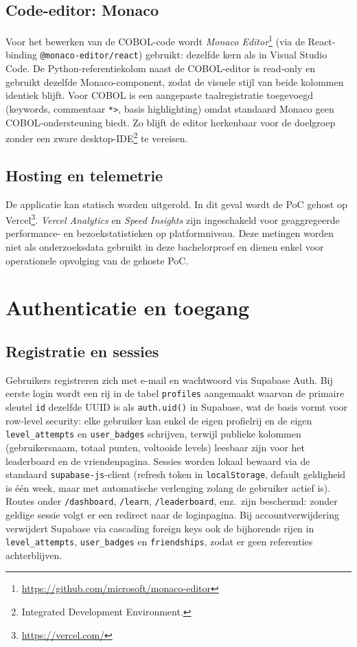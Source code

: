 \subsection{Code-editor: Monaco}
Voor het bewerken van de COBOL-code wordt \textit{Monaco Editor}\footnote{\url{https://github.com/microsoft/monaco-editor}} (via de React-binding \texttt{@monaco-editor/react}) gebruikt: dezelfde kern als in Visual Studio Code. De Python-referentiekolom naast de COBOL-editor is read-only en gebruikt dezelfde Monaco-component, zodat de visuele stijl van beide kolommen identiek blijft.
Voor COBOL is een aangepaste taalregistratie toegevoegd (keywords, commentaar \texttt{*>}, basis highlighting) omdat standaard Monaco geen COBOL-ondersteuning biedt.
Zo blijft de editor herkenbaar voor de doelgroep zonder een zware desktop-IDE\footnote{Integrated Development Environment.} te vereisen.

\subsection{Hosting en telemetrie}
De applicatie kan statisch worden uitgerold. In dit geval wordt de PoC gehost op Vercel\footnote{\url{https://vercel.com/}}.
\textit{Vercel Analytics} en \textit{Speed Insights} zijn ingeschakeld voor geaggregeerde performance- en bezoekstatistieken op platformniveau. Deze metingen worden niet als onderzoeksdata gebruikt in deze bachelorproef en dienen enkel voor operationele opvolging van de gehoste PoC.
\section{Authenticatie en toegang}

\subsection{Registratie en sessies}
Gebruikers registreren zich met e-mail en wachtwoord via Supabase Auth. Bij eerste login wordt een rij in de tabel \texttt{profiles} aangemaakt waarvan de primaire sleutel \texttt{id} dezelfde UUID is als \texttt{auth.uid()} in Supabase, wat de basis vormt voor row-level security: elke gebruiker kan enkel de eigen profielrij en de eigen \texttt{level\_attempts} en \texttt{user\_badges} schrijven, terwijl publieke kolommen (gebruikersnaam, totaal punten, voltooide levels) leesbaar zijn voor het leaderboard en de vriendenpagina.
Sessies worden lokaal bewaard via de standaard \texttt{supabase-js}-client (refresh token in \texttt{localStorage}, default geldigheid is één week, maar met automatische verlenging zolang de gebruiker actief is).
Routes onder \texttt{/dashboard}, \texttt{/learn}, \texttt{/leaderboard}, enz.\ zijn beschermd: zonder geldige sessie volgt er een redirect naar de loginpagina. 
Bij accountverwijdering verwijdert Supabase via cascading foreign keys ook de bijhorende rijen in \texttt{level\_attempts}, \texttt{user\_badges} en \texttt{friendships}, zodat er geen referenties achterblijven.

